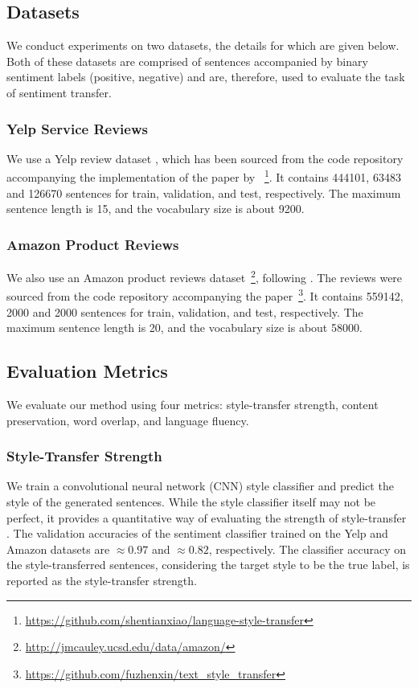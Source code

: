 \documentclass[letterpaper]{article} %
\newcommand{\citeay}[1]{\citeauthor{#1} \shortcite{#1}}
\begin{document}
\subsection{Datasets}

We conduct experiments on two datasets, the details for which are given below.
Both of these datasets are comprised of sentences accompanied by binary sentiment labels (positive, negative) and are, therefore, used to evaluate the task of sentiment transfer.

\subsubsection{Yelp Service Reviews}

We use a Yelp review dataset \cite{challenge2013yelp}, which has been sourced from the code repository accompanying the implementation of the paper by \citeay{shen2017style}~\footnote{\url{https://github.com/shentianxiao/language-style-transfer}}.
It contains 444101, 63483 and 126670 sentences for train, validation, and test, respectively.
The maximum sentence length is 15, and the vocabulary size is about 9200.

\subsubsection{Amazon Product Reviews}

We also use an Amazon product reviews dataset~\footnote{\url{http://jmcauley.ucsd.edu/data/amazon/}}, following \citeay{fu2017style}.
The reviews were sourced from the code repository accompanying the paper~\footnote{\url{https://github.com/fuzhenxin/text_style_transfer}}.
It contains 559142, 2000 and 2000 sentences for train, validation, and test, respectively.
The maximum sentence length is 20, and the vocabulary size is about 58000.

\subsection{Evaluation Metrics}

We evaluate our method using four metrics: style-transfer strength, content preservation, word overlap, and language fluency.

\subsubsection{Style-Transfer Strength}
We train a convolutional neural network (CNN) style classifier \cite{kim2014convolutional} and predict the style of the generated sentences.
While the style classifier itself may not be perfect, it provides a quantitative way of evaluating the strength of style-transfer \cite{hu2017toward,shen2017style,fu2017style}.
The validation accuracies of the sentiment classifier trained on the Yelp and Amazon datasets are $\approx 0.97$ and $\approx 0.82$, respectively.
The classifier accuracy on the style-transferred sentences, considering the target style to be the true label, is reported as the style-transfer strength.
\end{document}
